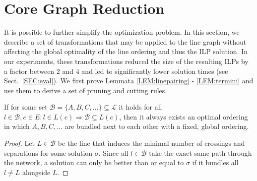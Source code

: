 \documentclass[sigconf]{acmart}
\begin{document}
\section{Core Graph Reduction}\label{SEC:coreprobgraph}
%
It is possible to further simplify the optimization problem. In this section, we describe a set of transformations that may be applied to the line graph without affecting the global optimality of the line ordering and thus the ILP solution. In our experiments, these transformations reduced the size of the resulting ILPs by a factor between 2 and 4 and led to significantly lower solution times (see Sect.~\ref{SEC:eval}). We first prove Lemmata \ref{LEM:linepairing} - \ref{LEM:termini} and use them to derive a set of pruning and cutting rules.
\begin{lemma}\label{LEM:linepairing}
If for some set $\mathcal{B} = \{A, B, C, ...\} \subseteq \mathcal{L}$ it holds for all $l \in \mathcal{B}, e \in E: l \in L(e) \Rightarrow \mathcal{B} \subseteq L(e)$, then it always exists an optimal ordering in which $A, B, C, ...$ are bundled next to each other with a fixed, global ordering.
\end{lemma}
\begin{proof}
Let $L \in \mathcal{B}$ be the line that induces the minimal number of crossings and separations for some solution $\sigma$. Since all $l \in \mathcal{B}$ take the exact same path through the network, a solution can only be better than or equal to $\sigma$ if it bundles all $l \neq L$ alongside $L$.
\end{proof}
\end{document}
